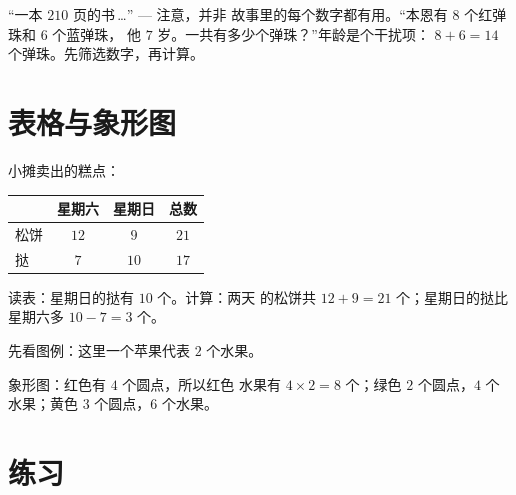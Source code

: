 \begin{example}[隐藏的多余数字]\label{ex:g2:problems:extra}
“一本 $210$ 页的书\,\dots” --- 注意，并非
故事里的每个数字都有用。“本恩有 $8$ 个红弹珠和 $6$ 个蓝弹珠，
他 $7$ 岁。一共有多少个弹珠？”年龄是个干扰项：
$8 + 6 = 14$ 个弹珠。先筛选数字，再计算。
\end{example}

\section{表格与象形图}

\begin{example}[表格]\label{ex:g2:problems:table}
小摊卖出的糕点：
\begin{center}
\renewcommand{\arraystretch}{1.3}
\begin{tabular}{l|ccc}
 & 星期六 & 星期日 & 总数 \\
\hline
松饼 & $12$ & $9$ & $21$ \\
挞 & $7$ & $10$ & $17$ \\
\end{tabular}
\end{center}
读表：星期日的挞有 $10$ 个。计算：两天
的松饼共 $12 + 9 = 21$ 个；星期日的挞比星期六多 $10 - 7 = 3$ 个。
\end{example}

\begin{example}[象形图]\label{ex:g2:problems:pictogram}
先看图例：这里一个苹果代表 $2$ 个水果。

\begin{omfigure}

{\small 象形图：红色有 $4$ 个圆点，所以红色
水果有 $4 \times 2 = 8$ 个；绿色 $2$ 个圆点，$4$ 个水果；黄色 $3$ 个圆点，$6$ 个水果。}
\end{omfigure}
\end{example}

\section{练习}


